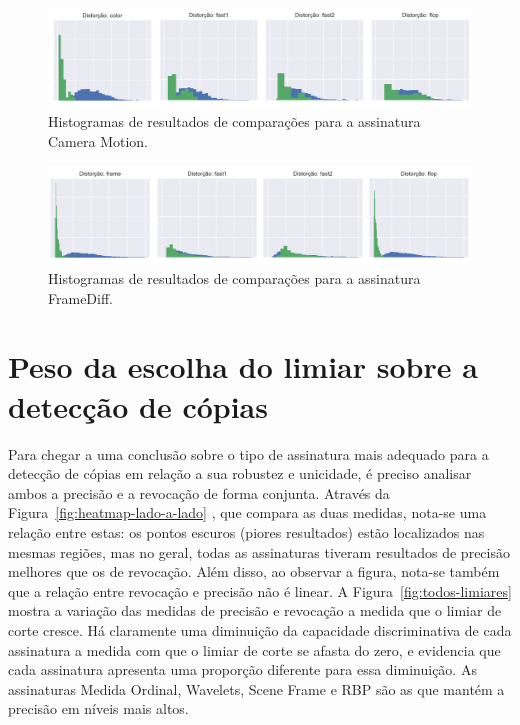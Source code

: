 \begin{figure}[h]
	\centering
	\caption{Histogramas de resultados de comparações para a assinatura Camera Motion.}
	\label{fig:histograma-camera-motion}
	\includegraphics[width=\textwidth]{dados/figuras/experimentos/histograma_distorcao_Camera_Motion_cortado.png}
\end{figure}

\begin{figure}[h]
	\centering
	\caption{Histogramas de resultados de comparações para a assinatura FrameDiff.}
	\label{fig:histograma-framediff}
	\includegraphics[width=\textwidth]{dados/figuras/experimentos/histograma_distorcao_FrameDiff_cortado.png}
\end{figure}

\section{Peso da escolha do limiar sobre a detecção de cópias}

Para chegar a uma conclusão sobre o tipo de assinatura mais adequado para a detecção de cópias em relação a sua robustez e unicidade, é preciso analisar ambos a precisão e a revocação de forma conjunta. Através da Figura~\ref{fig:heatmap-lado-a-lado} , que compara as duas medidas, nota-se uma relação entre estas: os pontos escuros (piores resultados) estão localizados nas mesmas regiões, mas no geral, todas as assinaturas tiveram resultados de precisão melhores que os de revocação. Além disso, ao observar a figura, nota-se também que a relação entre revocação e precisão não é linear. A Figura~\ref{fig:todos-limiares} mostra a variação das medidas de precisão e revocação a medida que o limiar de corte cresce. Há claramente uma diminuição da capacidade discriminativa de cada assinatura a medida com que o limiar de corte se afasta do zero, e evidencia que cada assinatura apresenta uma proporção diferente para essa diminuição. As assinaturas Medida Ordinal, Wavelets, Scene Frame e RBP são as que mantém a precisão em níveis mais altos. 

